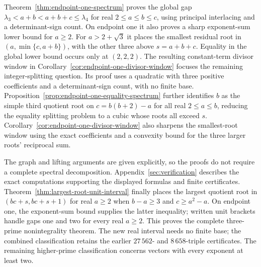 Theorem~\ref{thm:endpoint-one-spectrum} proves the global gap
$\lambda_3<a+b<a+b+c\leq\lambda_4$ for real $2\leq a\leq b\leq c$,
using principal interlacing and a determinant-sign count.
On endpoint one it also proves a sharp exponent-sum lower bound for $a\geq2$.
For $a>2+\sqrt3$ it places the smallest residual root in $(a,\min\{c,a+b\})$, with the
other three above $s=a+b+c$. Equality in the global lower bound occurs
only at $(2,2,2)$. The resulting constant-term divisor window in
Corollary~\ref{cor:endpoint-one-divisor-window} focuses the remaining
integer-splitting question. Its proof uses a quadratic with three positive coefficients
and a determinant-sign count, with no finite base.
Proposition~\ref{prop:endpoint-one-equality-spectrum} further identifies
$b$ as the simple third quotient root on $c=b(b+2)-a$ for all real
$2\leq a\leq b$, reducing the equality
splitting problem to a cubic whose roots all exceed $s$. Corollary~\ref{cor:endpoint-one-divisor-window}
also sharpens the smallest-root window using the exact coefficients and
a convexity bound for the three larger roots' reciprocal sum.

The graph and lifting arguments are given explicitly, so the proofs do not
require a complete spectral decomposition. Appendix~\ref{sec:verification}
describes the exact computations supporting the displayed formulas and
finite certificates. Theorem~\ref{thm:largest-root-unit-interval} finally places the largest
quotient root in $(bc+s,bc+s+1)$ for real $a\geq2$ when $b-a\geq3$
and $c\geq a^2-a$.
On endpoint one, the exponent-sum bound supplies the latter inequality;
written unit brackets handle gaps one and two for every real $a\geq2$.
This proves the complete
three-prime nonintegrality theorem. The new real interval needs no finite
base; the combined classification retains the earlier $27\,562$- and
$8\,658$-triple certificates. The remaining higher-prime
classification concerns vectors with every exponent at least two.
